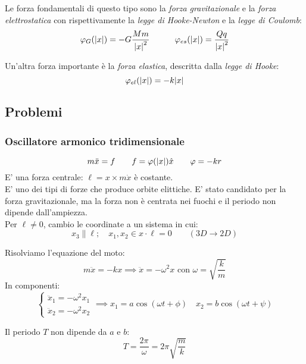 Le forza fondamentali di questo tipo sono la \textit{forza gravitazionale} e la \textit{forza elettrostatica} 
con rispettivamente la \textit{legge di Hooke-Newton} e la \textit{legge di Coulomb}:
\begin{equation}
    \varphi_G(\abs{x})= -G\frac{Mm}{\abs{x}^2}\qquad \quad \varphi_{es}(\abs{x})=\frac{Qq}{\abs{x}^2}
\end{equation}

Un'altra forza importante è la \textit{forza elastica}, descritta dalla \textit{legge di Hooke}:
\begin{equation}
    \varphi_{el}(\abs{x})= -k\abs{x}
\end{equation}


\subsection{Problemi}

\subsubsection{Oscillatore armonico tridimensionale}
\begin{equation}
    m\ddot{x}= f \qquad f = \varphi(\abs{x})\hat{x}\qquad \varphi = -kr
\end{equation}
E' una forza centrale: $\ell= x\times m\dot{x}$ è costante.\\
E' uno dei tipi di forze che produce orbite elittiche. 
E' stato candidato per la forza gravitazionale, ma la forza non è centrata nei fuochi
e il periodo non dipende dall'ampiezza.\\

Per $\ell  \neq 0$, cambio le coordinate a un sistema in cui:
\begin{equation}
    x_3 \parallel \ell; \quad x_1,x_2 \in x\cdot\ell=0  \qquad (3D\rightarrow 2D)
\end{equation}

Risolviamo l'equazione del moto:
\begin{equation*}
    m\ddot{x}= -kx \implies \ddot{x}= -\omega^2 x \text{ con } \omega= \sqrt{\frac{k}{m}}
\end{equation*}
In componenti:
\begin{equation}
    \begin{cases}
        \ddot{x}_1= -\omega^2 x_1\\
        \ddot{x}_2= -\omega^2 x_2
    \end{cases}\implies
    x_1 = a \cos(\omega t +\phi)\quad x_2= b\cos(\omega t + \psi)
\end{equation}
\begin{remark}
    Il periodo $T$ non dipende da $a$ e $b$:
    \begin{equation}
        T = \frac{2\pi}{\omega}= 2\pi\sqrt{\frac{m}{k}}
    \end{equation} 
\end{remark}

